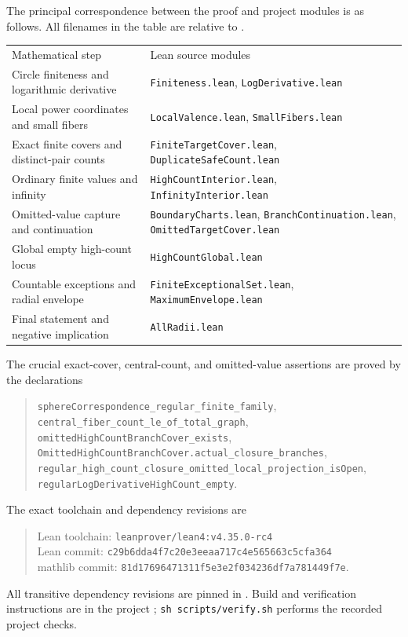 \documentclass[11pt]{article}
\numberwithin{equation}{section}
\begin{document}
The principal correspondence between the proof and project modules is
as follows. All filenames in the table are relative to
.
\begin{center}
\small
\begin{tabular}{>{\raggedright\arraybackslash}p{}
                >{\raggedright\arraybackslash}p{}}
Mathematical step & Lean source modules\\[3pt]
Circle finiteness and logarithmic derivative &
\nolinkurl{Finiteness.lean}, \nolinkurl{LogDerivative.lean}\\[3pt]
Local power coordinates and small fibers &
\nolinkurl{LocalValence.lean}, \nolinkurl{SmallFibers.lean}\\[3pt]
Exact finite covers and distinct-pair counts &
\nolinkurl{FiniteTargetCover.lean}, \nolinkurl{DuplicateSafeCount.lean}\\[3pt]
Ordinary finite values and infinity &
\nolinkurl{HighCountInterior.lean}, \nolinkurl{InfinityInterior.lean}\\[3pt]
Omitted-value capture and continuation &
\nolinkurl{BoundaryCharts.lean}, \nolinkurl{BranchContinuation.lean},
\nolinkurl{OmittedTargetCover.lean}\\[3pt]
Global empty high-count locus & \nolinkurl{HighCountGlobal.lean}\\[3pt]
Countable exceptions and radial envelope &
\nolinkurl{FiniteExceptionalSet.lean}, \nolinkurl{MaximumEnvelope.lean}\\[3pt]
Final statement and negative implication & \nolinkurl{AllRadii.lean}
\end{tabular}
\end{center}

The crucial exact-cover, central-count, and omitted-value assertions are
proved by the declarations
\begin{quote}\small
\nolinkurl{sphereCorrespondence_regular_finite_family},\\
\nolinkurl{central_fiber_count_le_of_total_graph},\\
\nolinkurl{omittedHighCountBranchCover_exists},\\
\nolinkurl{OmittedHighCountBranchCover.actual_closure_branches},\\
\nolinkurl{regular_high_count_closure_omitted_local_projection_isOpen},\\
\nolinkurl{regularLogDerivativeHighCount_empty}.
\end{quote}

The exact toolchain and dependency revisions are
\begin{quote}\small
Lean toolchain: \nolinkurl{leanprover/lean4:v4.35.0-rc4}\\
Lean commit: \nolinkurl{c29b6dda4f7c20e3eeaa717c4e565663c5cfa364}\\
mathlib commit: \nolinkurl{81d17696471311f5e3e2f034236df7a781449f7e}.
\end{quote}
All transitive dependency revisions are pinned in .
Build and verification instructions are in the project ;
\texttt{sh scripts/verify.sh} performs the recorded project checks.
\end{document}
